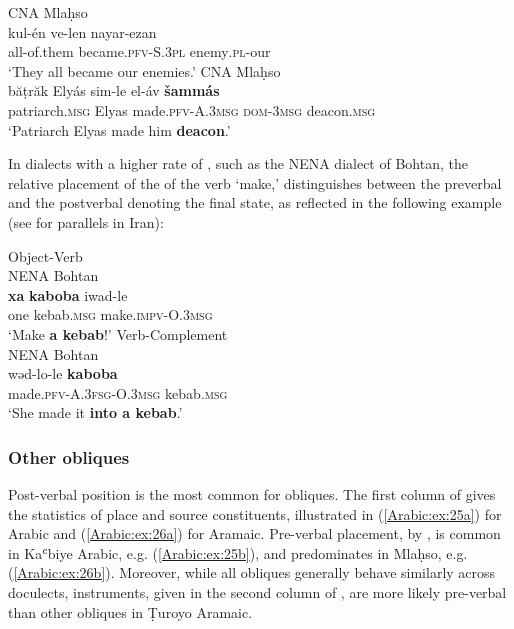 \documentclass[output=paper,colorlinks,citecolor=brown,draftmode]{langscibook}
\begin{document}
\ea
\ea\label{Arabic:ex:23a}
CNA Mlaḥso \citep[112.§50]{Jastrow1994Mlahso} \\
\gll kul-én ve-len nayar-ezan \\
     all-of.them became\textsc{.pfv-S.3pl} enemy\textsc{.pl}-our \\
\glt `They all became our enemies.'
\ex\label{Arabic:ex:23b}
CNA Mlaḥso \citep[ 116.§75]{Jastrow1994Mlahso} \\
\gll băṭrăk Elyás sim-le el-áv \textbf{šammás} \\
     patriarch\textsc{.msg} Elyas made\textsc{.pfv-A.3msg} \textsc{dom-3msg} deacon\textsc{.msg} \\
\glt `Patriarch Elyas made him \textbf{deacon}.' 
\z
\z

In dialects with a higher rate of , such as the NENA dialect of Bohtan, the relative placement of the  of the verb `make,' distinguishes between the preverbal  and the postverbal  denoting the final state, as reflected in the following example (see  for parallels in Iran):

\ea
\ea\label{Arabic:ex:24a}
Object-Verb\\
NENA Bohtan \citep[55]{Fox2009NABohtan} \\
\gll \textbf{xa} \textbf{kaboba} iwad-le \\
     one kebab\textsc{.msg} make\textsc{.impv-O.3msg} \\
\glt `Make \textbf{a kebab}!' 
\ex\label{Arabic:ex:24b}
Verb-Complement\\
NENA Bohtan \citep[56]{Fox2009NABohtan} \\
\gll wəd-lo-le \textbf{kaboba} \\
     made\textsc{.pfv-A.3fsg-O.3msg} kebab\textsc{.msg} \\
\glt `She made it \textbf{into a kebab}.' 
\z
\z

\subsubsection{Other obliques}\label{Arabic:2.2.4}
\largerpage
Post-verbal position is the most common for obliques. The first column of  gives the statistics of place and source constituents, illustrated in (\ref{Arabic:ex:25a}) for Arabic and (\ref{Arabic:ex:26a}) for Aramaic. Pre-verbal placement, by , is common in Kaʿbiye Arabic, e.g. (\ref{Arabic:ex:25b}), and predominates in Mlaḥso, e.g. (\ref{Arabic:ex:26b}). Moreover, while all obliques generally behave similarly across doculects, instruments, given in the second column of , are more likely pre-verbal than other obliques in Ṭuroyo Aramaic.
\end{document}
